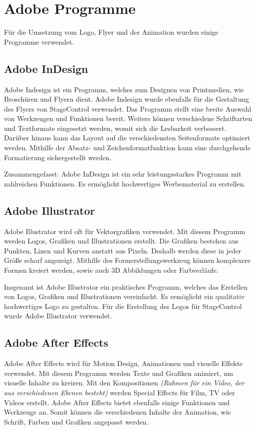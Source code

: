 \section{Adobe Programme}
Für die Umsetzung vom Logo, Flyer und der Animation wurden einige Programme verwendet.

\subsection{Adobe InDesign}
Adobe Indesign ist ein Programm, welches zum Designen von Printmedien, wie Broschüren und Flyern dient.
Adobe Indesign wurde ebenfalls für die Gestaltung des Flyers von StageControl verwendet. Das Programm stellt eine breite Auswahl von Werkzeugen und Funktionen bereit. Weiters können verschiedene Schriftarten und Textformate eingesetzt werden, womit sich die Lesbarkeit verbessert. Darüber hinaus kann das Layout auf die verschiedensten Seitenformate optimiert werden. Mithilfe der Absatz- und Zeichenformatfunktion kann eine durchgehende Formatierung sichergestellt werden. \parencite{AdobeIndesign}

Zusammengefasst: Adobe InDesign ist ein sehr leistungsstarkes Programm mit zahlreichen Funktionen. Es ermöglicht hochwertiges Werbematerial zu erstellen.

\subsection{Adobe Illustrator}
Adobe Illustrator wird oft für Vektorgrafiken verwendet. Mit diesem Programm werden Logos, Grafiken und Illustrationen erstellt. Die Grafiken bestehen aus Punkten, Linen und Kurven anstatt aus Pixeln. Deshalb werden diese in jeder Größe scharf angezeigt. Mithilfe des Formerstellungswerkzeug können komplexere Formen kreiert werden, sowie auch 3D Abbildungen oder Farbverläufe. \parencite{AdobeIllustrator}

Insgesamt ist Adobe Illustrator ein praktisches Programm, welches das Erstellen von Logos, Grafiken und Illustrationen vereinfacht. Es ermöglicht ein qualitativ hochwertiges Logo zu gestalten. Für die Erstellung des Logos für StageControl wurde Adobe Illustrator verwendet.

\subsection{Adobe After Effects}
Adobe After Effects wird für Motion Design, Animationen und visuelle Effekte verwendet. Mit diesem Programm werden Texte und Grafiken animiert, um visuelle Inhalte zu kreiren. Mit den Kompositionen \textit{(Rahmen für ein Video, der aus verschiedenen Ebenen besteht)} werden Special Effects für Film, TV oder Videos erstellt. Adobe After Effects bietet ebenfalls einige Funktionen und Werkzeuge an. Somit können die verschiedenen Inhalte der Animation, wie Schrift, Farben und Grafiken angepasst werden. \parencite{AdobeAfterEffects}

